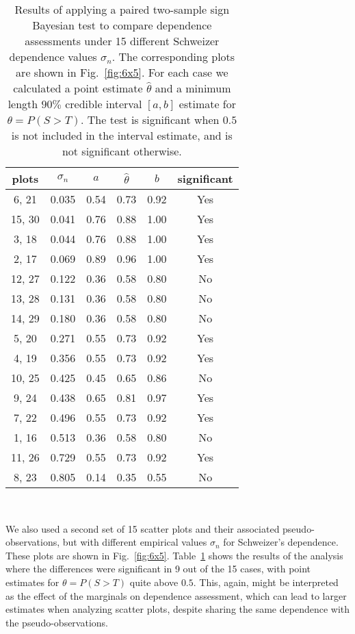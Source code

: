 \documentclass[journal]{vgtc}                %
\begin{document}
\begin{table}[ht!]
    \centering
    \renewcommand{\arraystretch}{1.1}
    \begin{tabular}{|c|c|c|c|c|c|} \hline 
        plots & $\sigma_n$ & $a$ & $\hat{\theta}$ & $b$ & significant \\ \hline 
         6, 21 &  0.035 & 0.54 & 0.73 & 0.92 & Yes \\
        15, 30 &  0.041 & 0.76 & 0.88 & 1.00 & Yes \\
         3, 18 &  0.044 & 0.76 & 0.88 & 1.00 & Yes \\
         2, 17 &  0.069 & 0.89 & 0.96 & 1.00 & Yes \\
        12, 27 &  0.122 & 0.36 & 0.58 & 0.80 & No \\
        13, 28 &  0.131 & 0.36 & 0.58 & 0.80 & No \\
        14, 29 &  0.180 & 0.36 & 0.58 & 0.80 & No \\
         5, 20 &  0.271 & 0.55 & 0.73 & 0.92 & Yes \\
         4, 19 &  0.356 & 0.55 & 0.73 & 0.92 & Yes \\
        10, 25 &  0.425 & 0.45 & 0.65 & 0.86 & No \\
         9, 24 &  0.438 & 0.65 & 0.81 & 0.97 & Yes \\
         7, 22 &  0.496 & 0.55 & 0.73 & 0.92 & Yes \\
         1, 16 &  0.513 & 0.36 & 0.58 & 0.80 & No \\
        11, 26 &  0.729 & 0.55 & 0.73 & 0.92 & Yes \\
         8, 23 &  0.805 & 0.14 & 0.35 & 0.55 & No \\ \hline
    \end{tabular} \\ \medskip
    
    \caption{Results of applying a paired two-sample sign Bayesian test to compare dependence assessments under 15 different Schweizer dependence values $\sigma_n$. The corresponding plots are shown in Fig.~\ref{fig:6x5}. For each case we calculated a point estimate $\hat{\theta}$ and a minimum length $90\%$ credible interval $[a,b]$ estimate for $\theta=P(S>T).$ The test is significant when $0.5$ is not included in the interval estimate, and is not significant otherwise.}
    \label{tab:plots15}
\end{table}



We also used a second set of 15 scatter plots and their associated pseudo-observations, but with different empirical values $\sigma_n$ for Schweizer's dependence. These plots are shown in Fig.~\ref{fig:6x5}. Table~\ref{tab:plots15} shows the results of the analysis where the differences were significant in 9 out of the 15 cases, with point estimates for $\theta=P(S>T)$ quite above $0.5$. This, again, might be interpreted as the effect of the marginals on dependence assessment, which can lead to larger estimates when analyzing scatter plots, despite sharing the same dependence with the pseudo-observations.
\end{document}

